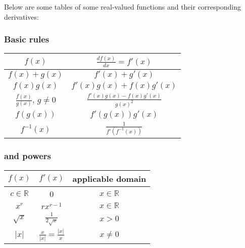 \documentclass[12pt]{article}
\begin{document}
Below are some tables of some real-valued functions and their corresponding derivatives:

\subsubsection*{Basic rules}

\begin{center}
\begin{tabular}{|c|c|}
\hline
$f(x)$ & $\displaystyle{\frac{df(x)}{dx}} = f'(x)$ \\
\hline\hline
$f(x) + g(x)$ & $f'(x)+g'(x)$ \\
\hline
$f(x)g(x)$ & $f'(x)g(x)+f(x)g'(x)$ \\
\hline
$\displaystyle \frac{f(x)}{g(x)},\, g\neq 0$ & $\displaystyle \frac{f'(x)g(x)-f(x)g'(x)}{g(x)^2}$ \\
\hline
$f(g(x))$&$f'(g(x))g'(x)$ \\
\hline
$f^{-1}(x)$& $\displaystyle{\frac{1}{f'(f^{-1}(x))}}$ \\
\hline
\end{tabular}
\end{center}

\subsubsection*{ and powers}

\begin{center}
\begin{tabular}{|c|c|c|}
\hline
$f(x)$ & $f'(x)$ & applicable domain \\
\hline\hline
$c\in \mathbb{R}$ & 0 & $x\in \mathbb{R}$ \\
\hline
$x^r$ & $rx^{r-1}$ & $x\in \mathbb{R}$ \\
\hline
$\sqrt{x}$ & $\displaystyle\frac{1}{2\sqrt{x}}$ & $x>0$ \\
\hline
$|x|$ & $\displaystyle\frac{x}{|x|}=\frac{|x|}{x}$ & $x\ne 0$ \\
\hline
\end{tabular}
\end{center}
\end{document}
